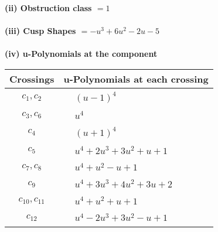 \documentclass[1p]{elsarticle_modified}
\theoremstyle{definition}
\begin{document}
\flushleft \textbf{(ii) Obstruction class $= 1$}\\~\\
\flushleft \textbf{(iii) Cusp Shapes $= - u^3+6 u^2-2 u-5$}\\~\\
\newpage\renewcommand{\arraystretch}{1}
\flushleft \textbf{(iv) u-Polynomials at the component}\newline \\
\begin{tabular}{m{50pt}|m{274pt}}
Crossings & \hspace{64pt}u-Polynomials at each crossing \\
\hline $$\begin{aligned}c_{1},c_{2}\end{aligned}$$&$\begin{aligned}
&(u-1)^4
\end{aligned}$\\
\hline $$\begin{aligned}c_{3},c_{6}\end{aligned}$$&$\begin{aligned}
&u^4
\end{aligned}$\\
\hline $$\begin{aligned}c_{4}\end{aligned}$$&$\begin{aligned}
&(u+1)^4
\end{aligned}$\\
\hline $$\begin{aligned}c_{5}\end{aligned}$$&$\begin{aligned}
&u^4+2 u^3+3 u^2+u+1
\end{aligned}$\\
\hline $$\begin{aligned}c_{7},c_{8}\end{aligned}$$&$\begin{aligned}
&u^4+u^2- u+1
\end{aligned}$\\
\hline $$\begin{aligned}c_{9}\end{aligned}$$&$\begin{aligned}
&u^4+3 u^3+4 u^2+3 u+2
\end{aligned}$\\
\hline $$\begin{aligned}c_{10},c_{11}\end{aligned}$$&$\begin{aligned}
&u^4+u^2+u+1
\end{aligned}$\\
\hline $$\begin{aligned}c_{12}\end{aligned}$$&$\begin{aligned}
&u^4-2 u^3+3 u^2- u+1
\end{aligned}$\\
\hline
\end{tabular}\\~\\
\end{document}
